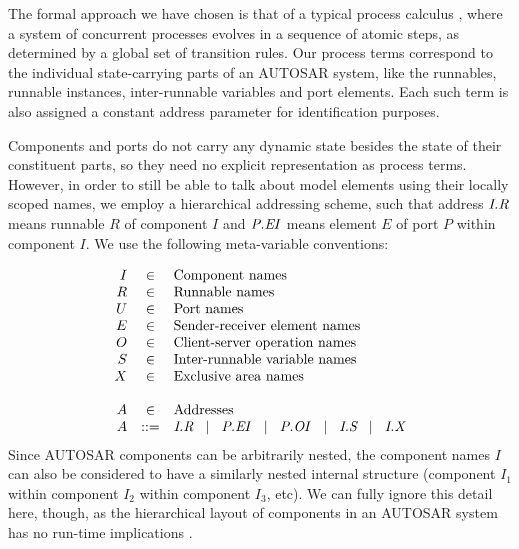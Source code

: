 \documentclass[twocolumn]{article}
\begin{document}
The formal approach we have chosen is that of a typical process calculus \cite{TODO}, where a system of concurrent processes evolves in a sequence of atomic steps, as determined by a global set of transition rules. Our process terms correspond to the individual state-carrying parts of an AUTOSAR system, like the runnables, runnable instances, inter-runnable variables and port elements. Each such term is also assigned a constant address parameter for identification purposes.

Components and ports do not carry any dynamic state besides the state of their constituent parts, so they need no explicit representation as process terms. However, in order to still be able to talk about model elements using their locally scoped names, we employ a hierarchical addressing scheme, such that address $\Tr{R}{I}$ means runnable $R$ of component $I$ and $\Te{E}{P}{I}$ means element $E$ of port $P$ within component $I$. We use the following meta-variable conventions:

%
\[
\begin{array}{rcll}
	I	& \in		& \text{Component names} \\
	R	& \in		& \text{Runnable names} \\
	U	& \in		& \text{Port names} \\
	E	& \in		& \text{Sender-receiver element names} \\
	O	& \in		& \text{Client-server operation names} \\
	S	& \in		& \text{Inter-runnable variable names} \\
	X	& \in		& \text{Exclusive area names} \\
	\\
	A	& \in		& \text{Addresses} \\
	A	& ::=		& \Tr{R}{I}   \sep   \Te{E}{P}{I}   \sep \To{O}{P}{I}   \sep   \Ts{S}{I}   \sep   \Tx{X}{I}   \\
\end{array}
\]
%
Since AUTOSAR components can be arbitrarily nested, the component names $I$ can also be considered to have a similarly nested internal structure (component $I_1$ within component $I_2$ within component $I_3$, etc). We can fully ignore this detail here, though, as the hierarchical layout of components in an AUTOSAR system has no run-time implications \cite{TODO2}.
\end{document}
